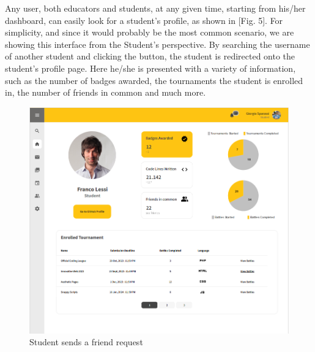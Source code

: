 \documentclass[12pt,oneside,a4paper]{article}
\begin{document}
\begin{flushleft}  
Any user, both educators and students, at any given time, starting from his/her dashboard, can easily look for a student's profile, as shown in [Fig. 5]. For simplicity, and since it would probably be the most common scenario, we are showing this interface from the Student's perspective. By searching the username of another student and clicking the button, the student is redirected onto the student's profile page. Here he/she is presented with a variety of information, such as the number of badges awarded, the tournaments the student is enrolled in, the number of friends in common and much more.
\end{flushleft}
\begin{figure}[htbp]
    \centering
    \includegraphics[width=1\linewidth]{Images/Interfaces/StudentProfile.PNG}
    \caption{Student sends a friend request}
    \label{fig:enter-label}
\end{figure}

\pagebreak
\end{document}
